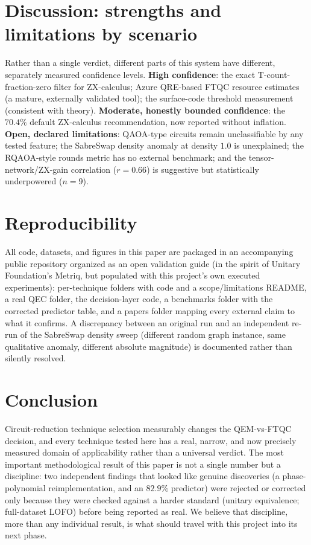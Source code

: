 \documentclass[9pt,twocolumn]{extarticle}
\begin{document}
\section{Discussion: strengths and limitations by scenario}
Rather than a single verdict, different parts of this system have different,
separately measured confidence levels. \textbf{High confidence}: the exact
T-count-fraction-zero filter for ZX-calculus; Azure QRE-based FTQC resource
estimates (a mature, externally validated tool); the surface-code threshold
measurement (consistent with theory). \textbf{Moderate, honestly bounded
confidence}: the $70.4\%$ default ZX-calculus recommendation, now reported
without inflation. \textbf{Open, declared limitations}: QAOA-type circuits
remain unclassifiable by any tested feature; the SabreSwap density anomaly
at density $1.0$ is unexplained; the RQAOA-style rounds metric has no
external benchmark; and the tensor-network/ZX-gain correlation
($r=0.66$) is suggestive but statistically underpowered ($n=9$).

\section{Reproducibility}
\label{sec:reproducibility}
All code, datasets, and figures in this paper are packaged in an
accompanying public repository organized as an open validation guide (in
the spirit of Unitary Foundation's Metriq, but populated with this
project's own executed experiments): per-technique folders with code and a
scope/limitations README, a real QEC folder, the decision-layer code, a
benchmarks folder with the corrected predictor table, and a papers folder
mapping every external claim to what it confirms. A discrepancy between an
original run and an independent re-run of the SabreSwap density sweep
(different random graph instance, same qualitative anomaly, different
absolute magnitude) is documented rather than silently resolved.

\section{Conclusion}
Circuit-reduction technique selection measurably changes the QEM-vs-FTQC
decision, and every technique tested here has a real, narrow, and now
precisely measured domain of applicability rather than a universal verdict.
The most important methodological result of this paper is not a single
number but a discipline: two independent findings that looked like genuine
discoveries (a phase-polynomial reimplementation, and an $82.9\%$ predictor)
were rejected or corrected only because they were checked against a harder
standard (unitary equivalence; full-dataset LOFO) before being reported as
real. We believe that discipline, more than any individual result, is what
should travel with this project into its next phase.
\end{document}
